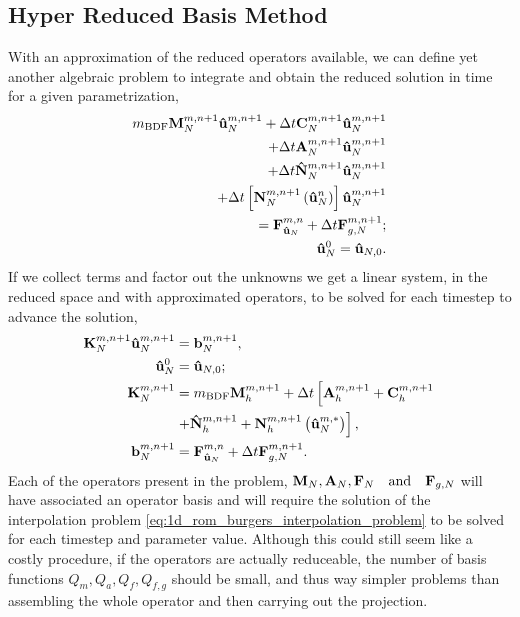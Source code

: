 \documentclass[../../thesis.tex]{subfiles}
\newcommand{\dt}{\ensuremath{\Delta t}}
\newcommand{\Ahm}[1]{\ensuremath{\vb{#1}^{m, n+1}_h}}
\begin{document}
\subsection{Hyper Reduced Basis Method}
With an approximation of the reduced operators available, 
we can define yet another algebraic problem to integrate and 
obtain the reduced solution in time for a given parametrization,
\begin{subequations}
    \label{eq:1d_hrom_weak_formulation_discrete}
    \begin{align}
        m_{\text{BDF}} \vb{M}^{m, n+1}_{N} \vb{\hat{u}}_{N}^{m, n+1}
        + \dt \vb{C}^{m, n+1}_{N} \vb{\hat{u}}_{N}^{m, n+1}
        \nonumber 
        \\ 
        + \dt \vb{A}^{m, n+1}_{N} \vb{\hat{u}}_{N}^{m, n+1}
        \nonumber 
        \\ 
        + \dt \vb{\hat{N}}^{m, n+1}_{N} \vb{\hat{u}}_{N}^{m, n+1}
        \nonumber 
        \\ 
        + \dt \left[\vb{N}^{m, n+1}_{N}\left(\vb{\hat{u}}_{N}^{n}\right)\right] \vb{\hat{u}}_{N}^{m, n+1}
        \nonumber
        \\
        = \vb{F}_{\vb{\hat{u}}_{N}}^{m, n}
        + \dt \vb{F}_{g,N}^{m, n+1};
        \\
        \vb{\hat{u}}_N^{0} = \vb{\hat{u}}_{N,0}.
    \end{align}
\end{subequations}
If we collect terms and factor out the unknowns we get a linear system, 
in the reduced space and with approximated operators, 
to be solved for each timestep to advance the solution,
\begin{subequations}
    \label{eq:1d_hrom_linear_system_timestep}
    \begin{align}
        \vb{K}_{N}^{m, n+1} \vb{\hat{u}}_{N}^{m, n+1} &= \vb{b}_{N}^{m, n+1}, 
        \\
        \vb{\hat{u}}_{N}^{0} &= \vb{\hat{u}}_{N,0};
        \\
        \vb{K}_{N}^{m, n+1} &= m_{\text{BDF}} \Ahm{M} + \dt \left[\Ahm{A} + \Ahm{C} \right. 
        \nonumber 
        \\
                        &\left. + \Ahm{\hat{N}} + \Ahm{N}\left(\vb{\hat{u}}_{N}^{m, *}\right)\right],
        \\
        \vb{b}_{N}^{m, n+1} &= \vb{F}_{\vb{\hat{u}}_{N}}^{m,n} + \dt \vb{F}_{g,N}^{m, n+1}.
    \end{align}
\end{subequations}
Each of the operators present in the problem, 
$\vb{M}_N, \vb{A}_N, \vb{F}_N \qqtext{and} \vb{F}_{g,N}$ will have associated 
an operator basis and will require the solution of 
the interpolation problem \eqref{eq:1d_rom_burgers_interpolation_problem} 
to be solved for each timestep and parameter value.
Although this could still seem like a costly procedure, 
if the operators are actually reduceable, 
the number of basis functions $Q_m, Q_a, Q_f, Q_{f,g}$ should be small,
and thus way simpler problems than assembling the whole operator and 
then carrying out the projection. 
\end{document}
